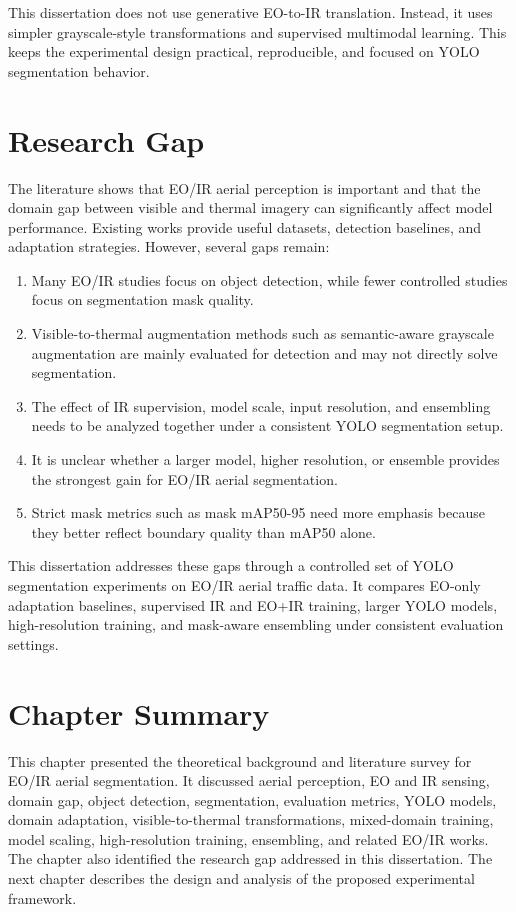 This dissertation does not use generative EO-to-IR translation. Instead, it uses simpler grayscale-style transformations and supervised multimodal learning. This keeps the experimental design practical, reproducible, and focused on YOLO segmentation behavior.

\section{Research Gap}

The literature shows that EO/IR aerial perception is important and that the domain gap between visible and thermal imagery can significantly affect model performance. Existing works provide useful datasets, detection baselines, and adaptation strategies. However, several gaps remain:

\begin{enumerate}
    \item Many EO/IR studies focus on object detection, while fewer controlled studies focus on segmentation mask quality.
    \item Visible-to-thermal augmentation methods such as semantic-aware grayscale augmentation are mainly evaluated for detection and may not directly solve segmentation.
    \item The effect of IR supervision, model scale, input resolution, and ensembling needs to be analyzed together under a consistent YOLO segmentation setup.
    \item It is unclear whether a larger model, higher resolution, or ensemble provides the strongest gain for EO/IR aerial segmentation.
    \item Strict mask metrics such as mask mAP50-95 need more emphasis because they better reflect boundary quality than mAP50 alone.
\end{enumerate}

This dissertation addresses these gaps through a controlled set of YOLO segmentation experiments on EO/IR aerial traffic data. It compares EO-only adaptation baselines, supervised IR and EO+IR training, larger YOLO models, high-resolution training, and mask-aware ensembling under consistent evaluation settings.

\section{Chapter Summary}

This chapter presented the theoretical background and literature survey for EO/IR aerial segmentation. It discussed aerial perception, EO and IR sensing, domain gap, object detection, segmentation, evaluation metrics, YOLO models, domain adaptation, visible-to-thermal transformations, mixed-domain training, model scaling, high-resolution training, ensembling, and related EO/IR works. The chapter also identified the research gap addressed in this dissertation. The next chapter describes the design and analysis of the proposed experimental framework.
